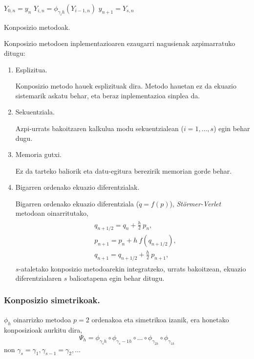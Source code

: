 \begin{algorithm}[H]
 \BlankLine
  {
   \BlankLine
    $Y_{0,n}=y_{n} $\;
    \BlankLine
   {
    \BlankLine 
    $Y_{i,n}=\phi_{\gamma_i h}(Y_{i-1,n})$\;
   }
   \BlankLine
    $y_{n+1}=Y_{s,n}$\;
   \BlankLine
 }
 \caption{Konposizio metodoak.}
 \label{alg:konp}
\end{algorithm}
 
Konposizio metodoen inplementazioaren ezaugarri nagusienak azpimarratuko ditugu:
\begin{enumerate}
\item{Esplizitua.}

Konposizio metodo hauek esplizituak dira. Metodo hauetan ez da ekuazio sistemarik askatu behar, eta beraz inplementazioa sinplea da. 

\item{Sekuentziala.}

Azpi-urrats bakoitzaren kalkulua modu sekuentzialean ($i=1,\dots,s$) egin behar dugu.

\item{Memoria gutxi.}

Ez da tarteko baliorik eta datu-egitura berezirik memorian gorde behar.   

\item{Bigarren ordenako ekuazio diferentzialak.}

Bigarren ordenako ekuazio diferentziala ($\ddot{q}=f(p)$), \emph{Störmer-Verlet} metodoan oinarritutako, 
\begin{align}
\begin{split}
&q_{{n+1}/{2}}=q_n+\frac{h}{2} \ p_n,\\
&p_{n+1}=p_n+h \ f(q_{{n+1}/{2}}),\\
&q_{n+1}=q_{{n+1}/{2}}+\frac{h}{2} \ p_{n+1},
\end{split}
\end{align}
$s$-ataletako konposizio metodoarekin integratzeko, urrats bakoitzean, ekuazio diferentzialaren $s$ balioztapena egin behar ditugu.

\end{enumerate}

\subsubsection*{Konposizio simetrikoak.}

\paragraph*{}$\phi_h$ oinarrizko metodoa $p=2$ ordenakoa eta simetrikoa izanik, era honetako konposizioak aurkitu dira,
\begin{equation}
\Psi_h=\phi_{\gamma_s h} \circ \phi_{\gamma_s-1 h} \circ \dots \circ \phi_{\gamma_{2 h}} \circ \phi_{\gamma_{1 h}} 
\end{equation}
non $\gamma_s=\gamma_1, \gamma_{s-1}=\gamma_2,\dots$ 

